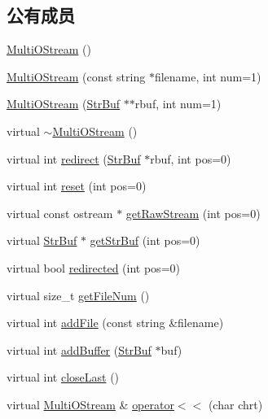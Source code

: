 \subsection*{公有成员}
\begin{DoxyCompactItemize}
\item 
\hyperlink{classHSF_1_1MultiOStream_aa480e0d213e42b0c566a3dfb508910b6}{MultiOStream} ()
\item 
\hyperlink{classHSF_1_1MultiOStream_a438ace99909dfb8edeb030fee3e389fd}{MultiOStream} (const string $\ast$filename, int num=1)
\item 
\hyperlink{classHSF_1_1MultiOStream_a4aac510e4c446ac42c8439cb436f84a1}{MultiOStream} (\hyperlink{namespaceHSF_a099dd77b4cb045fbbd0fb0dd0946e198}{StrBuf} $\ast$$\ast$rbuf, int num=1)
\item 
virtual \hyperlink{classHSF_1_1MultiOStream_ae743ac2c5f62bb631f10e0efdf45c0a5}{$\sim$MultiOStream} ()
\item 
virtual int \hyperlink{classHSF_1_1MultiOStream_a5b4339f2eafeae22419e413625b94216}{redirect} (\hyperlink{namespaceHSF_a099dd77b4cb045fbbd0fb0dd0946e198}{StrBuf} $\ast$rbuf, int pos=0)
\item 
virtual int \hyperlink{classHSF_1_1MultiOStream_aa9292b98a3ef97388d1aa6ce8119412f}{reset} (int pos=0)
\item 
virtual const ostream $\ast$ \hyperlink{classHSF_1_1MultiOStream_afb114bb87da89f7ea7ac65af6ffc65f2}{getRawStream} (int pos=0)
\item 
virtual \hyperlink{namespaceHSF_a099dd77b4cb045fbbd0fb0dd0946e198}{StrBuf} $\ast$ \hyperlink{classHSF_1_1MultiOStream_a2a33520e221422d2a10e1c3eace3029b}{getStrBuf} (int pos=0)
\item 
virtual bool \hyperlink{classHSF_1_1MultiOStream_a4f08ea78abbcd60f0d6460cdce6ea79d}{redirected} (int pos=0)
\item 
virtual size\_\-t \hyperlink{classHSF_1_1MultiOStream_ac0ac202ca73eb0c39d4b4b3f8f462f34}{getFileNum} ()
\item 
virtual int \hyperlink{classHSF_1_1MultiOStream_ad43365fb905b031fcbe0e9618daf8d28}{addFile} (const string \&filename)
\item 
virtual int \hyperlink{classHSF_1_1MultiOStream_a0fea8b810751922bf4b67b814b31b737}{addBuffer} (\hyperlink{namespaceHSF_a099dd77b4cb045fbbd0fb0dd0946e198}{StrBuf} $\ast$buf)
\item 
virtual int \hyperlink{classHSF_1_1MultiOStream_a60ad324c113b00270b59a9745e08a0c1}{closeLast} ()
\item 
virtual \hyperlink{classHSF_1_1MultiOStream}{MultiOStream} \& \hyperlink{classHSF_1_1MultiOStream_a5539fcb94f7ab127f5d41768f18c59d0}{operator$<$$<$} (char chrt)
$$
\end{DoxyCompactItemize}
